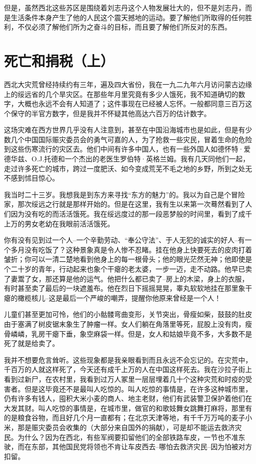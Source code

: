 \documentclass[10pt]{book}
\begin{document}
但是，虽然西北这些苏区是围绕着刘志丹这个人物发展壮大的，但不是刘志丹，而是生活条件本身产生了他的人民这个震天撼地的运动。要了解他们所取得的任何胜利，不仅必须了解他们所为之奋斗的目标，而且要了解他们所反对的东西。



\section{死亡和捐税（上）}

西北大灾荒曾经持续约有三年，遍及四大省份，我在一九二九年六月访问蒙古边缘上的绥远省的几个旱灾区。在那些年月里究竟有多少人饿死，我不知道确切的数字，大概也永远不会有人知道了；这件事现在已经被人忘怀。一般都同意三百万这个保守的半官方数字，但是我并不怀疑其他高达六百万的估计数字。

这场灾难在西方世界几乎没有人注意到，甚至在中国沿海城市也是如此，但是有少数几个中国国际赈灾委员会的勇气可嘉的人，为了抢救一些灾民，冒着生命的危险到这些伤寒流行的灾区去。他们中间有许多中国人，也有一些外国人如德怀特·爱德华兹、O.J.托德和一个杰出的老医生罗伯特·英格兰姆。我有几天同他们一起，走过许多死亡的城市，跨过一度肥沃、如今变成荒芜不毛之地的乡野，所到之处无不感到怵目惊心。

我当时二十三岁。我想我是到东方来寻找“东方的魅力”的。我以为自己是个冒险家，那次绥远之行就是那样开始的。但是在这里，我有生以来第一次蓦然看到了人们因为没有吃的而活活饿死。我在绥远度过的那一段恶梦般的时间里，看到了成千上万的男女老幼在我眼前活活饿死。

你有没有见到过一个人--一个辛勤劳动、“奉公守法”、于人无犯的诚实的好人--有一个多月没有吃饭了？这种景象真是令人惨不忍睹。挂在他身上快要死去的皮肉打着皱折；你可以一清二楚地看到他身上的每一根骨头；他的眼光茫然无神；他即使是个二十岁的青年，行动起来也象个干瘪的老太婆，一步一迈，走不动路。他早已卖了妻鬻了女，那还算是他的运气。他把什么都已卖了--房上的木梁，身上的衣服，有时甚至卖了最后的一块遮羞布。他在烈日下摇摇晃晃，睾丸软软地挂在那里象干瘪的橄榄核儿--这是最后一个严峻的嘲弄，提醒你他原来曾经是一个人！

儿童们甚至更加可怜，他们的小骷髅弯曲变形，关节突出，骨瘦如柴，鼓鼓的肚皮由于塞满了树皮锯末象生了肿瘤一样。女人们躺在角落里等死，屁股上没有肉，瘦骨嶙嶙，乳房干瘪下垂，象空麻袋一样。但是，女人和姑娘毕竟不多，大多数不是死了就是给卖了。

我并不想要危言耸听。这些现象都是我亲眼看到而且永远不会忘记的。在灾荒中，千百万的人就这样死了，今天还有成千上万的人在中国这样死去。我在沙拉子街上看到过新尸，在农村里，我看到过万人冢里一层层埋着几十个这种灾荒和时疫的受害者。但是这毕竟还不是最叫人吃惊的。叫人吃惊的事情是，在许多这种城市里，仍有许多有钱人，囤积大米小麦的商人、地主老财，他们有武装警卫保护着他们在大发其财。叫人吃惊的事情是，在城市里，做官的和歌妓舞女跳舞打麻将，那里有的是粮食谷物，而且好几个月一直都有；在北京天津等地，有千千万万吨的麦子小米，那是赈灾委员会收集的（大部分来自国外的捐献），可是却不能运去救济灾民。为什么？因为在西北，有些军阀要扣留他们的全部铁路车皮，一节也不准东驶，而在东部，其他国民党将领也不肯让车皮西去--哪怕去救济灾民--因为怕被对方扣留。
\end{document}
